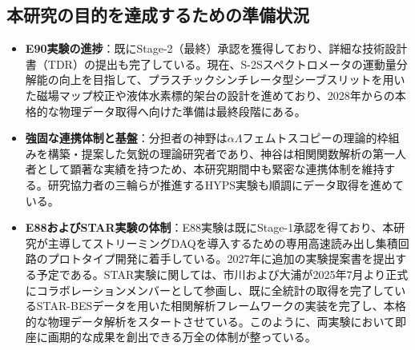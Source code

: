 \documentclass[11pt,a4j,dvipdfmx]{jarticle} 					%
\newcommand{\研究課題名}{加速器実験による短距離バリオン間相互作用の解明と中性子星ハイペロンパズルの解決}
\newcommand{\研究機関名}{東北大学}
\newcommand{\研究代表者氏名}{市川裕大}
\newcommand{\研究期間の最終元号年度}{13}
\begin{document}
\subsection{本研究の目的を達成するための準備状況}

\begin{itemize}
    \item \textbf{E90実験の進捗}：既にStage-2（最終）承認を獲得しており、詳細な技術設計書（TDR）の提出も完了している。現在、S-2Sスペクトロメータの運動量分解能の向上を目指して、プラスチックシンチレータ型シーブスリットを用いた磁場マップ校正や液体水素標的架台の設計を進めており、2028年からの本格的な物理データ取得へ向けた準備は最終段階にある。
    \item \textbf{強固な連携体制と基盤}：分担者の神野は$\alpha\Lambda$フェムトスコピーの理論的枠組みを構築・提案した気鋭の理論研究者であり、神谷は相関関数解析の第一人者として顕著な実績を持つため、本研究期間中も緊密な連携体制を維持する。研究協力者の三輪らが推進するHYPS実験も順調にデータ取得を進めている。
    \item \textbf{E88およびSTAR実験の体制}：E88実験は既にStage-1承認を得ており、本研究が主導してストリーミングDAQを導入するための専用高速読み出し集積回路のプロトタイプ開発に着手している。2027年に追加の実験提案書を提出する予定である。STAR実験に関しては、市川および大浦が2025年7月より正式にコラボレーションメンバーとして参画し、既に全統計の取得を完了しているSTAR-BESデータを用いた相関解析フレームワークの実装を完了し、本格的な物理データ解析をスタートさせている。このように、両実験において即座に画期的な成果を創出できる万全の体制が整っている。
\end{itemize}
\end{document}
